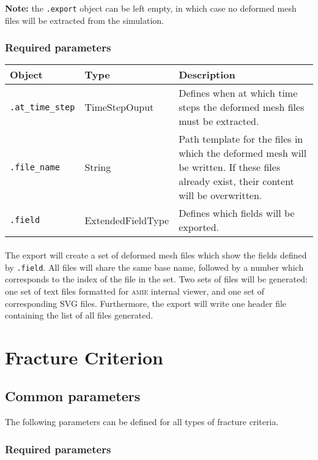 \documentclass[10pt]{article}
\begin{document}
\textbf{Note:} the \verb+.export+ object can be left empty, in which case no deformed mesh files will be extracted from the simulation.

\subsubsection*{Required parameters}

\begin{tabularx}{\textwidth}{llX}
\hline 
Object & Type & Description \\ 
\hline 
\verb+.at_time_step+ & TimeStepOuput & Defines when at which time steps the deformed mesh files must be extracted. \\ 
\verb+.file_name+ & String & Path template for the files in which the deformed mesh will be written. If these files already exist, their content will be overwritten.\\ 
\verb+.field+ & ExtendedFieldType & Defines which fields will be exported.\\
\hline 
\end{tabularx}

\paragraph{} The export will create a set of deformed mesh files which show the fields defined by \verb+.field+. All files will share the same base name, followed by a number which corresponds to the index of the file in the set. Two sets of files will be generated: one set of text files formatted for \textsc{amie} internal viewer, and one set of corresponding SVG files. Furthermore, the export will write one header file containing the list of all files generated.

\section{Fracture Criterion}

\subsection{Common parameters}

The following parameters can be defined for all types of fracture criteria.

\subsubsection*{Required parameters}
\end{document}
